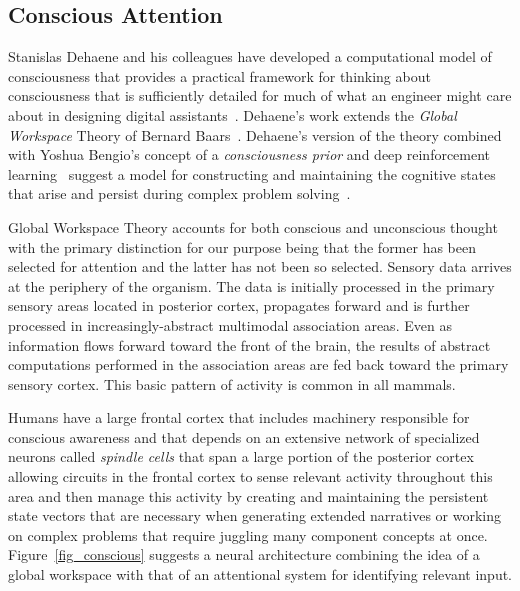 \documentclass[letterpaper,11pt]{article}
\def\urlh#1{{}}
\begin{document}

\subsection{Conscious Attention}
\label{subsection_conscious_attention}




Stanislas Dehaene and his colleagues have developed a computational model of consciousness that provides a practical framework for thinking about consciousness that is sufficiently detailed for much of what an engineer might care about in designing digital assistants~\cite{Dehaene2014}. Dehaene's work extends the {\it{Global Workspace}} Theory of Bernard Baars~\cite{Baars1988}. Dehaene's version of the theory combined with Yoshua Bengio's concept of a {\it{consciousness prior}} and deep reinforcement learning~\cite{MnihetalCoRR-13,NairetalCoRR-15} suggest a model for constructing and maintaining the cognitive states that arise and persist during complex problem solving~\cite{BengioCoRR-17}.

Global Workspace Theory accounts for both conscious and unconscious thought with the primary distinction for our purpose being that the former has been selected for attention and the latter has not been so selected. Sensory data arrives at the periphery of the organism. The data is initially processed in the primary sensory areas located in posterior cortex, propagates forward and is further processed in increasingly-abstract multimodal association areas. Even as information flows forward toward the front of the brain, the results of abstract computations performed in the association areas are fed back toward the primary sensory cortex. This basic pattern of activity is common in all mammals.

Humans have a large frontal cortex that includes machinery responsible for conscious awareness and that depends on an extensive network of specialized neurons called {\it{spindle cells}} that span a large portion of the posterior cortex allowing circuits in the frontal cortex to sense relevant activity throughout this area and then manage this activity by creating and maintaining the persistent state vectors that are necessary when generating extended narratives or working on complex problems that require juggling many component concepts at once. Figure~{\urlh{#fig_Global_Workspace_Conscious_Attention}{\ref{fig_conscious}}} suggests a neural architecture combining the idea of a global workspace with that of an attentional system for identifying relevant input.
\end{document}
